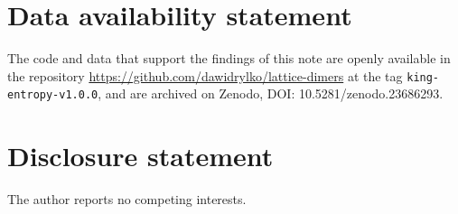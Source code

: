 \documentclass[11pt]{amsart}
\theoremstyle{definition}
\theoremstyle{remark}
\begin{document}
\section*{Data availability statement}
The code and data that support the findings of this note are openly available in the repository
\url{https://github.com/dawidrylko/lattice-dimers} at the tag
\texttt{king-entropy-v1.0.0}, and are archived on Zenodo,
DOI: 10.5281/zenodo.23686293.

\section*{Disclosure statement}
The author reports no competing interests.



\end{document}
